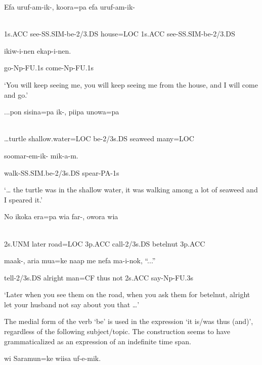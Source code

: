 \ea%
\label{ex:x1494}
\gll Efa  uruf-am-ik-,  koora=pa  efa  uruf-am-ik- \\
      \\
\glt
\z

1s.ACC  see-SS.SIM-be-2/3.DS  house=LOC  1s.ACC  see-SS.SIM-be-2/3.DS

ikiw-i-nen  ekap-i-nen.

go-Np-FU.1s  come-Np-FU.1s

`You will keep seeing me, you will keep seeing me from the house, and I will come and go.'

\ea%
\label{ex:x1495}
\gll ...pon  sisina=pa  ik-,  piipa  unowa=pa  \\
      \\
\glt
\z

{\dots}turtle  shallow.water=LOC  be-2/3s.DS  seaweed  many=LOC

soomar-em-ik-  mik-a-m.

walk-SS.SIM.be-2/3s.DS  spear-PA-1s

`{\dots} the turtle was in the shallow water, it was walking among a lot of seaweed and I speared it.'

\ea%
\label{ex:x1496}
\gll No  ikoka  era=pa  wia  far-,  owora  wia  \\
      \\
\glt
\z

2s.UNM  later  road=LOC  3p.ACC  call-2/3s.DS  betelnut  3p.ACC

maak-,  aria  mua=ke  naap  me  nefa  ma-i-nok,  ``...''

tell-2/3s.DS  alright  man=CF  thus  not  2s.ACC  say-Np-FU.3s

`Later when you see them on the road, when you ask them for betelnut, alright let your husband not say about you that {\dots}'

The  medial form of the verb `be' is used in the expression   `it is/was thus (and)', regardless of the following subject/topic. The construction seems to have grammaticalized as an expression of an indefinite time span.

\ea%
\label{ex:x1500}
\gll {}    wi  Saramun=ke  wiisa  uf-e-mik. \\
      \\
\glt
\z


